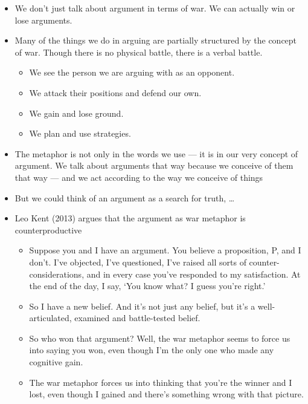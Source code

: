 \documentclass[a4paper,landscape,headrule,footrule,xetex]{foils}
\begin{document}
\begin{exe}
\ex {}
\ex {}
\ex {}
\ex {}
\ex {}
\ex {}
\ex {}
\ex {}
\ex {}
\end{exe}
\newpage
\begin{itemize}
\item We don't just talk about argument in terms of war. We can actually win or
lose arguments.
\item  Many of the things we do in arguing are partially structured by the concept of war.
Though there is no physical battle, there is a verbal battle.
\begin{itemize}
  \item  We see the person we are arguing with as an opponent.
  \item  We attack their positions and defend our own.
  \item  We gain and lose ground.
  \item  We plan and use strategies.
 \end{itemize}

\item The metaphor is not only in the words we use --- it is in our very concept of argument.  We talk about arguments that way because we conceive of them that way --- and we
act according to the way we conceive of things
\item But we could think of an argument as a search for truth, \ldots
\end{itemize}


\begin{itemize}
\item Leo Kent (2013) argues that the argument as war metaphor is counterproductive
  \begin{itemize}
  \item Suppose you and I have an argument. You believe a proposition, P, and I don't. I've objected, I've questioned, I've raised all sorts of counter-considerations, and in every case you've responded to my satisfaction. At the end of the day, I say, ‘You know what? I guess you're right.'
  \item So I have a new belief. And it's not just any belief, but it's a well-articulated, examined and battle-tested belief.
  \item So who won that argument? Well, the war metaphor seems to force us into saying you won, even though I'm the only one who made any cognitive gain.
  \item The war metaphor forces us into thinking that you're the winner and I lost, even though I gained and there's something wrong with that picture.
  \end{itemize}
  
\end{itemize}
\end{document}
